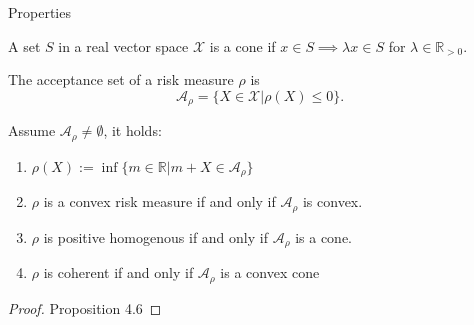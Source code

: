 \begin{subsection}{Properties}
        \begin{definition}
        A set \( S \) in a real vector space \( \mathcal{X} \) is a cone if \( x \in S \implies \lambda x \in S \) for \( \lambda \in \mathbb{R}_{>0} \).
        \end{definition}
        \begin{definition}
            The acceptance set of a risk measure \( \rho \) is 
            \[ \mathcal{A}_\rho = \{ X \in \mathcal{X} | \rho(X) \leq 0 \}. \]
        \end{definition}
        \begin{proposition} \label{acceptancesetpropisriskprop}
            Assume \( \mathcal{A}_{\rho} \neq \emptyset \), it holds:
            \begin{enumerate}
                \item \( \rho(X) := \inf \{ m \in \mathbb{R} | m + X \in \mathcal{A}_{\rho} \}   \) 
                \item \( \rho \) is a convex risk measure if and only if \( \mathcal{A}_{\rho} \) is convex.
                \item \( \rho \) is positive homogenous if and only if \( \mathcal{A}_{\rho} \) is a cone.
                \item \( \rho \) is coherent if and only if \( \mathcal{A}_{\rho} \) is a convex cone 
            \end{enumerate}
        \end{proposition}
        \begin{proof}
            \cite{foellmerschied} Proposition 4.6
        \end{proof}
\end{subsection}
